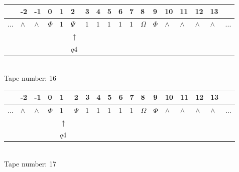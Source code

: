 \documentclass[11pt]{article}
\begin{document}
\begin{table}[H]
\centering
\begin{tabular}{llllllllllllllllll}
 & -2 & -1 & 0 & 1 & 2 & 3 & 4 & 5 & 6 & 7 & 8 & 9 & 10 & 11 & 12 & 13 & \\
\hline
$...$ & \multicolumn{1}{|l|}{$\wedge$} & \multicolumn{1}{|l|}{$\wedge$} & \multicolumn{1}{|l|}{$\Phi$} & \multicolumn{1}{|l|}{$1$} & \multicolumn{1}{|l|}{$\Psi$} & \multicolumn{1}{|l|}{$1$} & \multicolumn{1}{|l|}{$1$} & \multicolumn{1}{|l|}{$1$} & \multicolumn{1}{|l|}{$1$} & \multicolumn{1}{|l|}{$1$} & \multicolumn{1}{|l|}{$\Omega$} & \multicolumn{1}{|l|}{$\Phi$} & \multicolumn{1}{|l|}{$\wedge$} & \multicolumn{1}{|l|}{$\wedge$} & \multicolumn{1}{|l|}{$\wedge$} & \multicolumn{1}{|l|}{$\wedge$} & $...$\\
\hline
&  &  &  &  & $\uparrow$ &  &  &  &  &  &  &  &  &  &  &  &  \\
&  &  &  &  & $ q4 $ &  &  &  &  &  &  &  &  &  &  &  &  \\
\end{tabular}
\\
Tape number: 16
\noindent\makebox[\linewidth]{\hdashrule{\textwidth}{1pt}{1pt}}\end{table}

\begin{table}[H]
\centering
\begin{tabular}{llllllllllllllllll}
 & -2 & -1 & 0 & 1 & 2 & 3 & 4 & 5 & 6 & 7 & 8 & 9 & 10 & 11 & 12 & 13 & \\
\hline
$...$ & \multicolumn{1}{|l|}{$\wedge$} & \multicolumn{1}{|l|}{$\wedge$} & \multicolumn{1}{|l|}{$\Phi$} & \multicolumn{1}{|l|}{$1$} & \multicolumn{1}{|l|}{$\Psi$} & \multicolumn{1}{|l|}{$1$} & \multicolumn{1}{|l|}{$1$} & \multicolumn{1}{|l|}{$1$} & \multicolumn{1}{|l|}{$1$} & \multicolumn{1}{|l|}{$1$} & \multicolumn{1}{|l|}{$\Omega$} & \multicolumn{1}{|l|}{$\Phi$} & \multicolumn{1}{|l|}{$\wedge$} & \multicolumn{1}{|l|}{$\wedge$} & \multicolumn{1}{|l|}{$\wedge$} & \multicolumn{1}{|l|}{$\wedge$} & $...$\\
\hline
&  &  &  & $\uparrow$ &  &  &  &  &  &  &  &  &  &  &  &  &  \\
&  &  &  & $ q4 $ &  &  &  &  &  &  &  &  &  &  &  &  &  \\
\end{tabular}
\\
Tape number: 17
\noindent\makebox[\linewidth]{\hdashrule{\textwidth}{1pt}{1pt}}\end{table}
\clearpage
\end{document}
